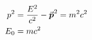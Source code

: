 

\vspace*{\fill}
\centering

\begin{align*}
    p^2 &= \frac{E^2}{c^2} - \va*{p}^2 = m^2c^2 \\
    E_0 &= mc^2
\end{align*}

\centering
\vspace*{\fill}

